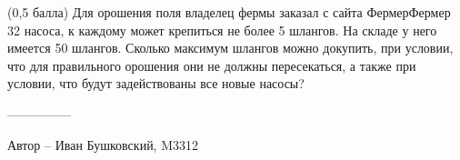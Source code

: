 \question
(0,5 балла) Для орошения поля владелец фермы заказал с сайта ФермерФермер 32 насоса, к каждому может крепиться не более 5 шлангов. На складе у него имеется 50 шлангов. Сколько максимум шлангов можно докупить, при условии, что для правильного орошения они не должны пересекаться, а также при условии, что будут задействованы все новые насосы?

---------------

Автор -- Иван Бушковский, M3312
